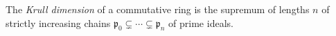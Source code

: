 
The \emph{Krull dimension} of a commutative ring is the supremum of lengths $n$ of strictly increasing chains $\mathfrak p_0\subsetneq\cdots\subsetneq\mathfrak p_n$ of prime ideals.
